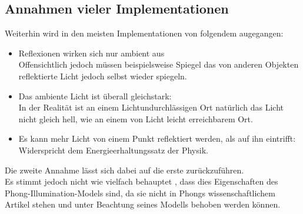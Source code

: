 \documentclass[a4paper]{scrartcl}%
\begin{document}
\newpage

    \subsection{Annahmen vieler Implementationen}%
    \label{sub:annahmen_vieler_implementationen}
    
        Weiterhin wird in den meisten Implementationen von folgendem augegangen:\\
        \begin{itemize}
            \item Reflexionen wirken sich nur ambient aus\\
                Offensichtlich jedoch müssen beispielsweise Spiegel das von anderen Objekten reflektierte Licht jedoch selbst wieder spiegeln.\\
            \item Das ambiente Licht ist überall gleichstark:\\
                In der Realität ist an einem Lichtundurchlässigen Ort natürlich das Licht nicht gleich hell, wie an einem von Licht leicht erreichbarem Ort.\\
            \item Es kann mehr Licht von einem Punkt reflektiert werden, als auf ihn eintrifft:\\
                Widerspricht dem Energieerhaltungssatz der Physik.\\
        \end{itemize}
        Die zweite Annahme lässt sich dabei auf die erste zurückzuführen.\\
        Es stimmt jedoch nicht wie vielfach behauptet \footnotemark[3] \footnotemark[4] \footnotemark[5], dass dies Eigenschaften des Phong-Illumination-Models sind,
        da sie nicht in Phongs wissenschaftlichem Artikel stehen und unter Beachtung seines Modells behoben werden können.\\%
\end{document}
